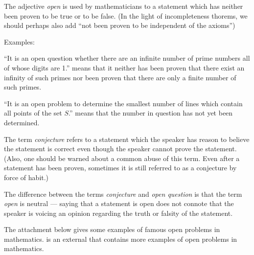 \documentclass[12pt]{article}
\begin{document}

The adjective \emph{open} is used by mathematicians to a statement which has neither been proven to be true or to be false.  (In the light of incompleteness thorems, we should perhaps also add ``not been proven to be independent of the axioms'')

Examples:  

``It is an open question whether there are an infinite number of prime numbers all of whose digits are 1.'' means that it neither has been proven that there exist an infinity of such primes nor been proven that there are only a finite number of such primes.

``It is an open problem to determine the smallest number of lines which contain all points of the set $S$.'' means that the number in question has not yet been determined.

The term \emph{conjecture} refers to a statement which the speaker has reason to believe the statement is correct even though the speaker cannot prove the statement.  (Also, one should be warned about a common abuse of this term.  Even after a statement has been proven, sometimes it is still referred to as a conjecture by force of habit.)

The difference between the terms \emph{conjecture} and \emph{open question} is that the term \emph{open} is neutral --- saying that a statement is open does not connote that the speaker is voicing an opinion regarding the truth or falsity of the statement.

The attachment below gives some examples of famous open problems in mathematics.   is an external  that contains more examples of open problems in mathematics.
\end{document}
